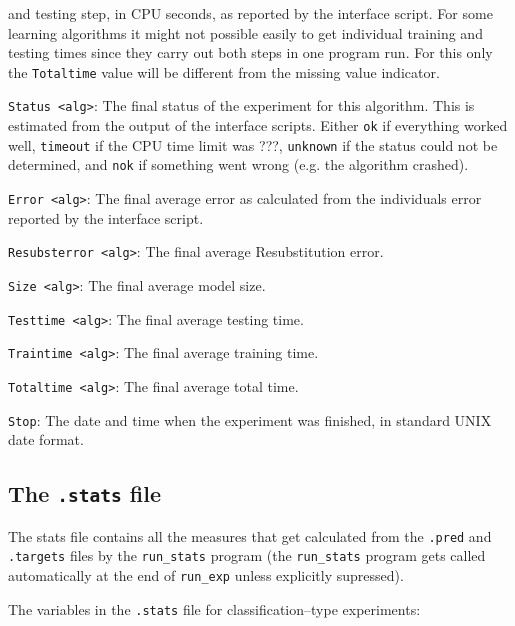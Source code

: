 \documentclass[a4paper,10pt,twoside]{article}
\newenvironment{optionlist}
{\begin{list}{}
    {\setlength{\itemsep}{0em plus0em minus0ex}
      \setlength{\parsep}{0ex}
      \setlength{\topsep}{0em}
      \setlength{\leftmargin}{2em}
      \setlength{\listparindent}{0em}
      \setlength{\itemindent}{-2em}
      \setlength{\partopsep}{0ex}
    }}
  {\end{list}}
\begin{document}
\begin{optionlist}
and testing step, 
in CPU seconds, as reported by the interface script. For some learning 
algorithms it might not possible easily to get individual training and 
testing times since they carry out both steps in one program run. For
this only the \verb=Totaltime= value will be different from the missing
value indicator.
\item \verb=Status <alg>=: The final status of the experiment for this
algorithm. This is estimated from the output of the interface scripts.
Either \texttt{ok} if everything worked well, \texttt{timeout} if 
the CPU time limit was ???, \texttt{unknown} if the status could not 
be determined, and \texttt{nok} if something went wrong (e.g. the algorithm
crashed).
\item \verb=Error <alg>=: The final average error as calculated 
from the individuals error reported by the interface script.
\item \verb=Resubsterror <alg>=: The final average Resubstitution error.
\item \verb=Size <alg>=: The final average model size.
\item \verb=Testtime <alg>=: The final average testing time.
\item \verb=Traintime <alg>=: The final average training time.
\item \verb=Totaltime <alg>=: The final average total time.
\item \verb=Stop=: The date and time when the experiment was finished, 
in standard UNIX date format.
\end{optionlist}
    
\subsection{The \texttt{.stats} file}

The stats file contains all the measures that get calculated from
the \texttt{.pred} and \texttt{.targets} files by the \verb=run_stats=
program (the \verb=run_stats= program gets called automatically
at the end of \verb=run_exp= unless explicitly supressed).

The variables in the \verb=.stats= file 
for classification--type experiments:
\end{document}
